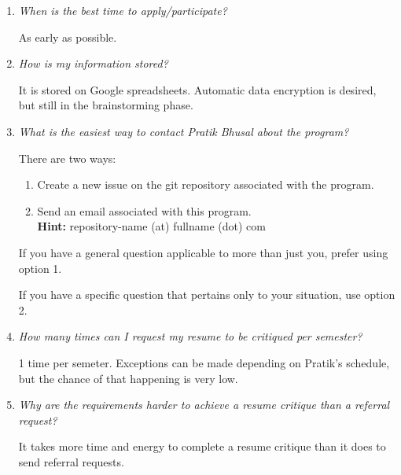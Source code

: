 \documentclass[letterpaper, 12pt]{article}
\newcommand{\QA}[2]{\textit{#1}\medskip

    #2\bigskip
}
\begin{document}
\begin{enumerate}[leftmargin=*]
    \item\QA%
        {When is the best time to apply/participate?}
        {As early as possible.}
    \item\QA%
        {How is my information stored?}
        {%
            It is stored on Google spreadsheets. Automatic data encryption is
            desired, but still in the brainstorming phase.
        }
    \item\QA%
        {What is the easiest way to contact Pratik Bhusal about the program?}
        {%
            There are two ways:

            \begin{enumerate}
                \item Create a new issue on the git repository associated with
                    the program.
                \item Send an email associated with this
                    program.\\\textbf{Hint:} repository-name (at) fullname (dot) com

            \end{enumerate}

            If you have a general question applicable to more than just you,
            prefer using option 1.

            If you have a specific question that pertains only to your
            situation, use option 2.
        }
    \item\QA%
        {How many times can I request my resume to be critiqued per semester?}
        {%
            1 time per semeter. Exceptions can be made depending on Pratik's
            schedule, but the chance of that happening is very low.
        }
    \item\QA%
        {Why are the requirements harder to achieve a resume critique than a
        referral request?}
        {%
            It takes more time and energy to complete a resume critique than it
            does to send referral requests.
        }
\end{enumerate}
\end{document}
